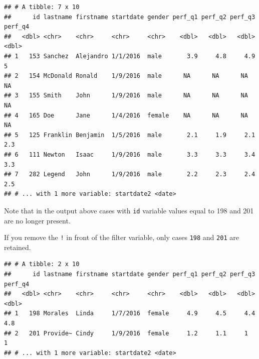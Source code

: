\documentclass[]{book}
\newenvironment{Shaded}{\begin{snugshade}}{\end{snugshade}}
\newcommand{\KeywordTok}[1]{\textcolor[rgb]{0.13,0.29,0.53}{\textbf{#1}}}
\newcommand{\DecValTok}[1]{\textcolor[rgb]{0.00,0.00,0.81}{#1}}
\newcommand{\StringTok}[1]{\textcolor[rgb]{0.31,0.60,0.02}{#1}}
\newcommand{\CommentTok}[1]{\textcolor[rgb]{0.56,0.35,0.01}{\textit{#1}}}
\newcommand{\OperatorTok}[1]{\textcolor[rgb]{0.81,0.36,0.00}{\textbf{#1}}}
\newcommand{\NormalTok}[1]{#1}
\begin{document}
\begin{Shaded}
\end{Shaded}

\begin{verbatim}
## # A tibble: 7 x 10
##      id lastname firstname startdate gender perf_q1 perf_q2 perf_q3 perf_q4
##   <dbl> <chr>    <chr>     <chr>     <chr>    <dbl>   <dbl>   <dbl>   <dbl>
## 1   153 Sanchez  Alejandro 1/1/2016  male       3.9     4.8     4.9     5  
## 2   154 McDonald Ronald    1/9/2016  male      NA      NA      NA      NA  
## 3   155 Smith    John      1/9/2016  male      NA      NA      NA      NA  
## 4   165 Doe      Jane      1/4/2016  female    NA      NA      NA      NA  
## 5   125 Franklin Benjamin  1/5/2016  male       2.1     1.9     2.1     2.3
## 6   111 Newton   Isaac     1/9/2016  male       3.3     3.3     3.4     3.3
## 7   282 Legend   John      1/9/2016  male       2.2     2.3     2.4     2.5
## # ... with 1 more variable: startdate2 <date>
\end{verbatim}

Note that in the output above cases with \texttt{id} variable values
equal to 198 and 201 are no longer present.

If you remove the \texttt{!} in front of the filter variable, only cases
\texttt{198} and \texttt{201} are retained.

\begin{Shaded}
\end{Shaded}

\begin{verbatim}
## # A tibble: 2 x 10
##      id lastname firstname startdate gender perf_q1 perf_q2 perf_q3 perf_q4
##   <dbl> <chr>    <chr>     <chr>     <chr>    <dbl>   <dbl>   <dbl>   <dbl>
## 1   198 Morales  Linda     1/7/2016  female     4.9     4.5     4.4     4.8
## 2   201 Provide~ Cindy     1/9/2016  female     1.2     1.1     1       1  
## # ... with 1 more variable: startdate2 <date>
\end{verbatim}
\end{document}
